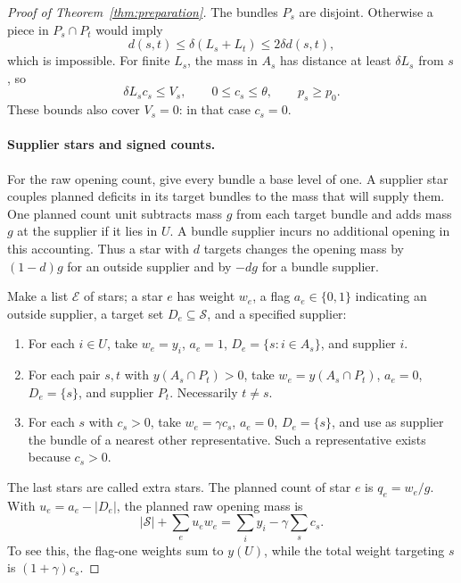 \begin{proof}[Proof of Theorem~\ref{thm:preparation}]
The bundles $P_s$ are disjoint.  Otherwise a piece in $P_s\cap P_t$
would imply
\[
 d(s,t)\le\delta(L_s+L_t)\le2\delta d(s,t),
\]
which is impossible.  For finite $L_s$, the mass in $A_s$ has distance
at least $\delta L_s$ from $s$, so
\begin{equation}\label{eq:prep-deficit-small}
 \delta L_s c_s\le V_s,\qquad
 0\le c_s\le\theta,\qquad p_s\ge p_0.
\end{equation}
These bounds also cover $V_s=0$: in that case $c_s=0$.

\paragraph{Supplier stars and signed counts.}
For the raw opening count, give every bundle a base level of one.  A
supplier star couples planned deficits in its target bundles to the
mass that will supply them.  One planned count unit subtracts mass $g$
from each target bundle and adds mass $g$ at the supplier if it lies in $U$.
A bundle supplier incurs no additional opening in this accounting.
Thus a star with $d$ targets changes the opening mass by $(1-d)g$ for
an outside supplier and by $-dg$ for a bundle supplier.

Make a list $\mathcal E$ of stars; a star $e$ has weight $w_e$, a flag
$a_e\in\{0,1\}$ indicating an outside supplier, a target set
$D_e\subseteq\mathcal S$, and a specified supplier:
\begin{enumerate}
 \item For each $i\in U$, take $w_e=y_i$, $a_e=1$,
 $D_e=\{s:i\in A_s\}$, and supplier $i$.
 \item For each pair $s,t$ with $y(A_s\cap P_t)>0$, take
 $w_e=y(A_s\cap P_t)$, $a_e=0$, $D_e=\{s\}$, and supplier $P_t$.
 Necessarily $t\ne s$.
 \item For each $s$ with $c_s>0$, take $w_e=\gamma c_s$, $a_e=0$,
 $D_e=\{s\}$, and use as supplier the bundle of a nearest other
 representative.  Such a representative exists because $c_s>0$.
\end{enumerate}
The last stars are called extra stars.  The planned count of star $e$
is $q_e=w_e/g$.  With $u_e=a_e-|D_e|$, the planned raw opening mass is
\begin{equation}\label{eq:prep-raw-identity}
 |\mathcal S|+\sum_e u_e w_e
 =\sum_i y_i-\gamma\sum_s c_s.
\end{equation}
To see this, the flag-one weights sum to $y(U)$, while the total weight
targeting $s$ is $(1+\gamma)c_s$.


\end{proof}
